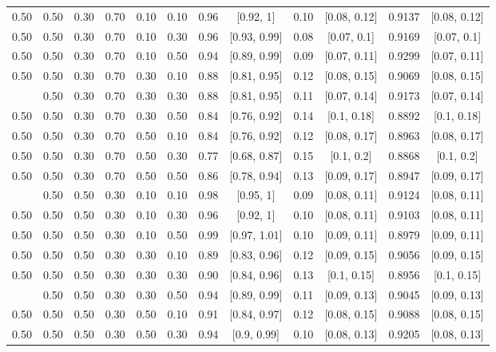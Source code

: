 \documentclass[
  11pt,
]{article}
\begin{document}
\begin{landscape}
\begin{ThreePartTable}
\begin{longtable}[t]{cccccccccccc}
0.50 & 0.50 & 0.30 & 0.70 & 0.10 & 0.10 & 0.96 & {}[0.92, 1] & 0.10 & {}[0.08, 0.12] & 0.9137 & {}[0.08, 0.12]\\
0.50 & 0.50 & 0.30 & 0.70 & 0.10 & 0.30 & 0.96 & {}[0.93, 0.99] & 0.08 & {}[0.07, 0.1] & 0.9169 & {}[0.07, 0.1]\\
0.50 & 0.50 & 0.30 & 0.70 & 0.10 & 0.50 & 0.94 & {}[0.89, 0.99] & 0.09 & {}[0.07, 0.11] & 0.9299 & {}[0.07, 0.11]\\
0.50 & 0.50 & 0.30 & 0.70 & 0.30 & 0.10 & 0.88 & {}[0.81, 0.95] & 0.12 & {}[0.08, 0.15] & 0.9069 & {}[0.08, 0.15]\\
\addlinespace
0.50 & 0.50 & 0.30 & 0.70 & 0.30 & 0.30 & 0.88 & {}[0.81, 0.95] & 0.11 & {}[0.07, 0.14] & 0.9173 & {}[0.07, 0.14]\\
0.50 & 0.50 & 0.30 & 0.70 & 0.30 & 0.50 & 0.84 & {}[0.76, 0.92] & 0.14 & {}[0.1, 0.18] & 0.8892 & {}[0.1, 0.18]\\
0.50 & 0.50 & 0.30 & 0.70 & 0.50 & 0.10 & 0.84 & {}[0.76, 0.92] & 0.12 & {}[0.08, 0.17] & 0.8963 & {}[0.08, 0.17]\\
0.50 & 0.50 & 0.30 & 0.70 & 0.50 & 0.30 & 0.77 & {}[0.68, 0.87] & 0.15 & {}[0.1, 0.2] & 0.8868 & {}[0.1, 0.2]\\
0.50 & 0.50 & 0.30 & 0.70 & 0.50 & 0.50 & 0.86 & {}[0.78, 0.94] & 0.13 & {}[0.09, 0.17] & 0.8947 & {}[0.09, 0.17]\\
\addlinespace
0.50 & 0.50 & 0.50 & 0.30 & 0.10 & 0.10 & 0.98 & {}[0.95, 1] & 0.09 & {}[0.08, 0.11] & 0.9124 & {}[0.08, 0.11]\\
0.50 & 0.50 & 0.50 & 0.30 & 0.10 & 0.30 & 0.96 & {}[0.92, 1] & 0.10 & {}[0.08, 0.11] & 0.9103 & {}[0.08, 0.11]\\
0.50 & 0.50 & 0.50 & 0.30 & 0.10 & 0.50 & 0.99 & {}[0.97, 1.01] & 0.10 & {}[0.09, 0.11] & 0.8979 & {}[0.09, 0.11]\\
0.50 & 0.50 & 0.50 & 0.30 & 0.30 & 0.10 & 0.89 & {}[0.83, 0.96] & 0.12 & {}[0.09, 0.15] & 0.9056 & {}[0.09, 0.15]\\
0.50 & 0.50 & 0.50 & 0.30 & 0.30 & 0.30 & 0.90 & {}[0.84, 0.96] & 0.13 & {}[0.1, 0.15] & 0.8956 & {}[0.1, 0.15]\\
\addlinespace
0.50 & 0.50 & 0.50 & 0.30 & 0.30 & 0.50 & 0.94 & {}[0.89, 0.99] & 0.11 & {}[0.09, 0.13] & 0.9045 & {}[0.09, 0.13]\\
0.50 & 0.50 & 0.50 & 0.30 & 0.50 & 0.10 & 0.91 & {}[0.84, 0.97] & 0.12 & {}[0.08, 0.15] & 0.9088 & {}[0.08, 0.15]\\
0.50 & 0.50 & 0.50 & 0.30 & 0.50 & 0.30 & 0.94 & {}[0.9, 0.99] & 0.10 & {}[0.08, 0.13] & 0.9205 & {}[0.08, 0.13]\\

\end{longtable}
\end{ThreePartTable}
\end{landscape}
\end{document}
